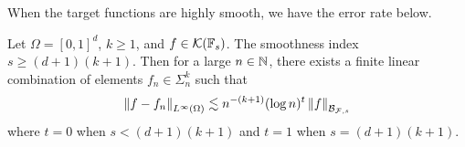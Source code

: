 When the target functions are highly smooth, we have the error rate below.

\begin{theorem}
    Let $\Omega = [0,1]^d$, $k \geq 1$, and $f \in \mathcal{K}(\mathbb{F}_s)$. The
    smoothness index $s \geq (d+1)(k+1)$. Then for a large $n \in \mathbb{N}$, there
    exists a finite linear combination of elements $f_n \in \Sigma_n^k$ such
    that
    \begin{equation}
        \left\| f-f_n \right\|_{L^{\infty}(\Omega)} \lesssim 
        n^{-(k+1)} (\log{n})^t \left\| f \right\|_{\mathcal{B}_{\mathcal{F},s}}
    \end{equation}
    where $t=0$ when $s < (d+1)(k+1)$ and $t=1$ when $s = (d+1)(k+1)$.
\end{theorem}

